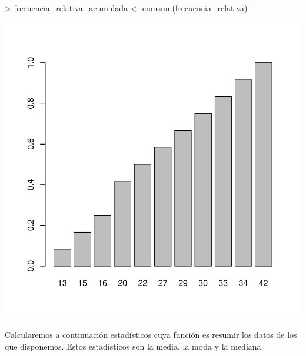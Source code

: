 \documentclass [a4paper] {article}
\begin{document}
\begin{Schunk}
\begin{Sinput}
> frecuencia_relativa_acumulada <- cumsum(frecuencia_relativa)
\end{Sinput}
\end{Schunk}
\begin{center}
\includegraphics{entrega-frecuencia_relativa_acumulada_satelites_plot}
\end{center}

Calcularemos a continuación estadísticos cuya función es resumir los datos de los que disponemos.
Estos estadísticos son la media, la moda y la mediana.
\end{document}
